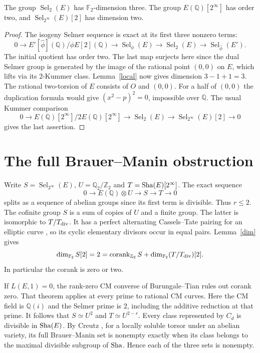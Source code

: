 \documentclass[11pt]{article}
\newcommand{\Q}{\mathbb Q}\newcommand{\Z}{\mathbb Z}\newcommand{\F}{\mathbb F}
\DeclareMathOperator{\Sel}{Sel}\DeclareMathOperator{\Br}{Br}
\begin{document}
\begin{lemma}\label{dim}
The group $\Sel_2(E)$ has $\F_2$-dimension three. The group $E(\Q)[2^\infty]$ has order two, and $\Sel_{2^\infty}(E)[2]$ has dimension two.
\end{lemma}
\begin{proof}
The isogeny Selmer sequence is exact at its first three nonzero terms:
\[
 0\longrightarrow E'[\widehat\phi](\Q)/\phi E[2](\Q)
 \longrightarrow\Sel_\phi(E)\longrightarrow\Sel_2(E)
 \longrightarrow\Sel_{\widehat\phi}(E').
\]
The initial quotient has order two. The last map surjects here since the dual Selmer group is generated by the image of the rational point $(0,0)$ on $E$, which lifts via its $2$-Kummer class. Lemma~\ref{local} now gives dimension $3-1+1=3$.
The rational two-torsion of $E$ consists of $O$ and $(0,0)$. For a half of $(0,0)$ the duplication formula would give $(x^2-p)^2=0$, impossible over $\Q$. The usual Kummer comparison
\[
 0\longrightarrow E(\Q)[2^\infty]/2E(\Q)[2^\infty]
 \longrightarrow \Sel_2(E)\longrightarrow\Sel_{2^\infty}(E)[2]
 \longrightarrow0
\]
gives the last assertion.
\end{proof}

\section{The full Brauer--Manin obstruction}
Write $S=\Sel_{2^\infty}(E)$, $U=\Q_2/\Z_2$ and $T=\mathop{\mathrm{Sha}}\nolimits(E)[2^\infty]$. The exact sequence
\[
 0\longrightarrow E(\Q)\otimes U\longrightarrow S\longrightarrow T\longrightarrow0
\]
splits as a sequence of abelian groups since its first term is divisible. Thus $r\le2$. The cofinite group $S$ is a sum of copies of $U$ and a finite group. The latter is isomorphic to $T/T_{\rm div}$. It has a perfect alternating Cassels--Tate pairing for an elliptic curve \cite{ps}, so its cyclic elementary divisors occur in equal pairs. Lemma~\ref{dim} gives
\[
 \dim_{\F_2} S[2]=2
   =\operatorname{corank}_{\Z_2}S+\dim_{\F_2}(T/T_{\rm div})[2].
\]
In particular the corank is zero or two.

If $L(E,1)=0$, the rank-zero CM converse of Burungale--Tian \cite[Thm.~1.1]{bt} rules out corank zero. That theorem applies at every prime to rational CM curves. Here the CM field is $\Q(i)$ and the Selmer prime is $2$, including the additive reduction at that prime. It follows that $S\simeq U^2$ and $T\simeq U^{2-r}$. Every class represented by $C_d$ is divisible in $\mathop{\mathrm{Sha}}\nolimits(E)$. By Creutz \cite[Prop.~18 and proof of Thm.~5]{creutz}, for a locally soluble torsor under an abelian variety, its full Brauer--Manin set is nonempty exactly when its class belongs to the maximal divisible subgroup of $\mathop{\mathrm{Sha}}\nolimits$. Hence each of the three sets is nonempty.
\end{document}
